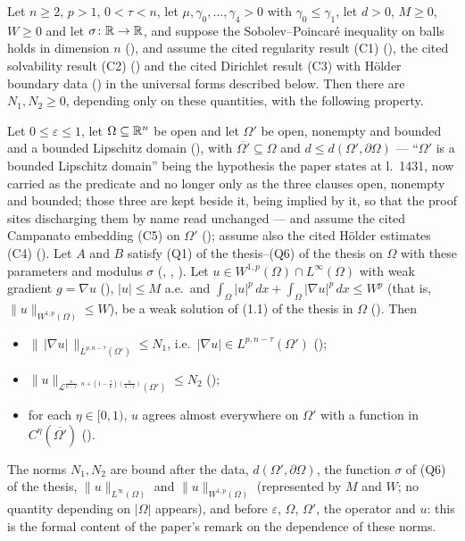 \begin{theorem}[Theorem 5]
Let $n\ge2$, $p>1$, $0<\tau<n$, let $\mu,\gamma_0,\dots,\gamma_4>0$ with
$\gamma_0\le\gamma_1$, let $d>0$, $M\ge0$, $W\ge0$ and let
$\sigma\colon\mathbb{R}\to\mathbb{R}$, and suppose the Sobolev--Poincar\'e inequality on balls holds in dimension $n$
(), and assume the cited regularity result
(C1) (), the cited solvability result (C2)
() and the cited Dirichlet result (C3) with H\"older
boundary data () in the universal forms described
below.  Then there are $N_1,N_2\ge0$, depending only on these
quantities, with the following property.

Let $0\le\varepsilon\le1$, let $\Omega\subseteq\mathbb{R}^n$ be open and let $\Omega'$ be
open, nonempty and bounded and a bounded Lipschitz domain
(), with $\overline{\Omega'}\subseteq\Omega$ and
$d\le d(\Omega',\partial\Omega)$ --- ``$\Omega'$ is a bounded Lipschitz domain'' being the hypothesis the paper states at l.~1431, now carried as the predicate  and no longer only as the three clauses open, nonempty and bounded; those three are kept beside it, being implied by it, so that the proof sites discharging them by name read unchanged ---
and assume the
cited Campanato embedding (C5) on $\Omega'$
(); assume also the cited H\"older estimates
(C4) ().  Let $A$ and $B$ satisfy
(Q1) of the thesis--(Q6) of the thesis on $\Omega$ with these parameters and modulus
$\sigma$ (, ,
).  Let
$u\in W^{1,p}(\Omega)\cap L^\infty(\Omega)$ with weak gradient $g=\nabla u$
(), $|u|\le M$ a.e.\ and
$\int_\Omega|u|^p\,dx+\int_\Omega|\nabla u|^p\,dx\le W^p$ (that is,
$\|u\|_{W^{1,p}(\Omega)}\le W$), be a weak solution of
(1.1) of the thesis in $\Omega$ ().  Then
\begin{itemize}
\item[(i)] $\|\,|\nabla u|\,\|_{L^{p,n-\tau}(\Omega')}\le N_1$, i.e.\
  $|\nabla u|\in L^{p,n-\tau}(\Omega')$ ();
\item[(ii)] $\|u\|_{\mathcal L^{\frac n{n-1},\,n+(1-\frac\tau p)(\frac n{n-1})}(\Omega')}\le N_2$
  (\noderef{CampanatoBoundOn});
\item[(iii)] for each $\eta\in[0,1)$, $u$ agrees almost everywhere on $\Omega'$
  with a function in $C^\eta(\overline{\Omega'})$ (\noderef{MemHolderOn}).
\end{itemize}
The norms $N_1,N_2$ are bound after the data, $d(\Omega',\partial\Omega)$, the
function $\sigma$ of (Q6) of the thesis, $\|u\|_{L^\infty(\Omega)}$ and
$\|u\|_{W^{1,p}(\Omega)}$ (represented by $M$ and $W$; no quantity depending on
$|\Omega|$ appears), and before $\varepsilon$,
$\Omega$, $\Omega'$, the operator and $u$: this is the formal content of the
paper's remark on the dependence of these norms.


\end{theorem}
